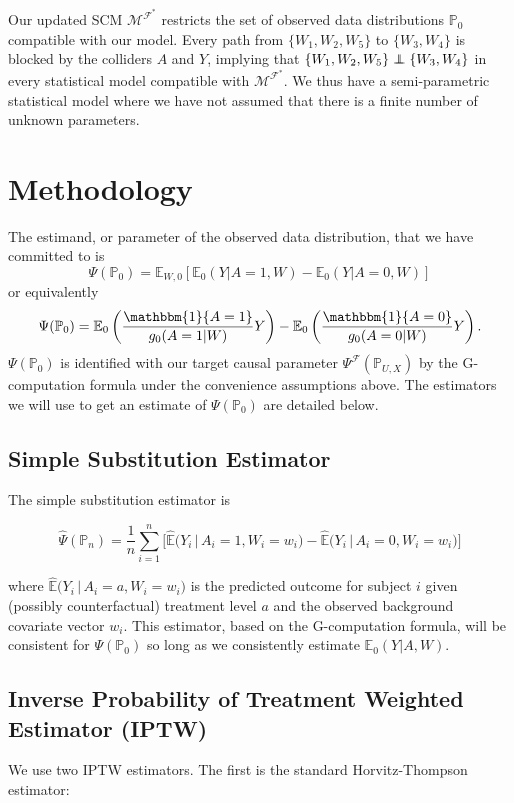 \documentclass[english, 12pt]{article}
\def\P{\mathbb{P}}
\def\E{\mathbb{E}}
\def\ind{\mathbbm{1}}
\def\giv{{\,|\,}}
\newcommand\independent{\protect\mathpalette{\protect\independenT}{\perp}}
\def\independenT#1#2{\mathrel{\rlap{$#1#2$}\mkern2mu{#1#2}}}
\begin{document}
Our updated SCM $\mathcal{M}^{\mathcal{F}^*}$ restricts the set of observed data distributions $\P_0$ compatible with our model. Every path from $\{W_1,W_2,W_5\}$ to $\{W_3, W_4\}$ is blocked by the colliders $A$ and $Y$, implying that $\{W_1,W_2,W_5\} \independent \{W_3, W_4\}$ in every statistical model compatible with $\mathcal{M}^{\mathcal{F}^*}$. We thus have a semi-parametric statistical model where we have not assumed that there is a finite number of unknown parameters. 

\section{Methodology}

The estimand, or parameter of the observed data distribution, that we have committed to is
    $$\Psi(\P_0) = \E_{W,0} [\E_0(Y|A = 1, W) - \E_0(Y|A = 0, W)]$$
    or equivalently
    $$\Psi(\P_0) = \E_0\left(\frac{\ind\{A = 1\}}{g_0(A=1|W)}Y\right) - \E_0\left(\frac{\ind\{A = 0\}}{g_0(A=0|W)}Y\right).$$
 $\Psi(\P_0)$ is identified with our target causal parameter $\Psi^{\mathcal{F}}(\P_{U,X})$ by the G-computation formula under the convenience assumptions above. The estimators we will use to get an estimate of $\Psi(\P_0)$ are detailed below.

\subsection{Simple Substitution Estimator}

The simple substitution estimator is

$$\hat{\Psi}(\P_n) = \frac{1}{n} \sum_{i=1}^n \bigg[ \hat{\E}\Big(Y_i \giv A_i = 1, W_i = w_i\Big) - \hat{\E}\Big(Y_i \giv A_i = 0, W_i=w_i\Big) \bigg]$$

where $\hat{\E}\Big(Y_i \giv A_i = a, W_i = w_i\Big)$ is the predicted outcome for subject $i$ given (possibly counterfactual) treatment level $a$ and the observed background covariate vector $w_i$. This estimator, based on the G-computation formula, will be consistent for $\Psi(\P_0)$ so long as we consistently estimate $\E_0(Y|A,W)$.

\subsection{Inverse Probability of Treatment Weighted Estimator (IPTW)}

We use two IPTW estimators. The first is the standard Horvitz-Thompson estimator:
\end{document}
